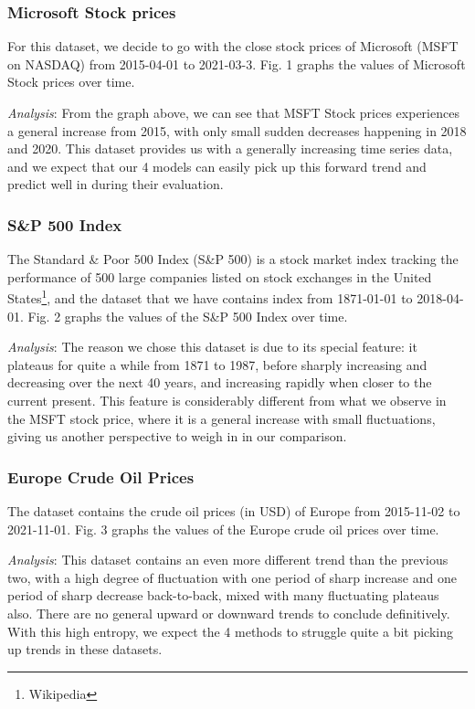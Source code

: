 \documentclass[letterpaper, 10 pt, conference]{ieeeconf}  %
\begin{document}
        \subsubsection{Microsoft Stock prices} For this dataset, we decide to go with the close stock prices of Microsoft (MSFT on NASDAQ) from 2015-04-01 to 2021-03-3. Fig. 1 graphs the values of Microsoft Stock prices over time.

        \textit{Analysis}: From the graph above, we can see that MSFT Stock prices experiences a general increase from 2015, with only small sudden decreases happening in 2018 and 2020. This dataset provides us with a generally increasing time series data, and we expect that our 4 models can easily pick up this forward trend and predict well in during their evaluation. 

        \subsubsection{S\&P 500 Index} The Standard \& Poor 500 Index (S\&P 500) is a stock market index tracking the performance of 500 large companies listed on stock exchanges in the United States\footnote{Wikipedia}, and the dataset that we have contains index from 1871-01-01 to 2018-04-01. Fig. 2 graphs the values of the S\&P 500 Index over time.

        \textit{Analysis}: The reason we chose this dataset is due to its special feature: it plateaus for quite a while from 1871 to 1987, before sharply increasing and decreasing over the next 40 years, and increasing rapidly when closer to the current present. This feature is considerably different from what we observe in the MSFT stock price, where it is a general increase with small fluctuations, giving us another perspective to weigh in in our comparison.

        \subsubsection{Europe Crude Oil Prices} The dataset contains the crude oil prices (in USD) of Europe from 2015-11-02 to 2021-11-01. Fig. 3 graphs the values of the Europe crude oil prices over time.

        \textit{Analysis}: This dataset contains an even more different trend than the previous two, with a high degree of fluctuation with one period of sharp increase and one period of sharp decrease back-to-back, mixed with many fluctuating plateaus also. There are no general upward or downward trends to conclude definitively. With this high entropy, we expect the 4 methods to struggle quite a bit picking up trends in these datasets. 
\end{document}
